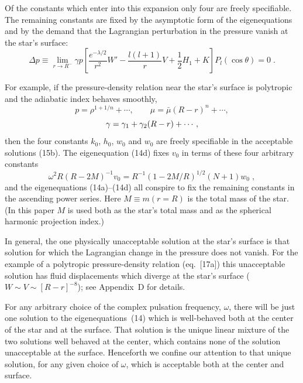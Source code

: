 \documentclass[12pt]{article}
\begin{document}
Of the constants which enter into this expansion only four are freely specifiable. The
remaining constants are fixed by the asymptotic form of the eigenequations and by the
demand that the Lagrangian perturbation in the pressure vanish at the star's surface:
\begin{equation}
  \Delta p \equiv \lim_{r \to R^-} \gamma p \left[
    \frac{e^{-\lambda/2}}{r^2} W' - \frac{l(l+1)}{r} V
    + \frac{1}{2} H_1 + K
  \right] P_l(\cos\theta) = 0\;.
\label{eq:16}
\end{equation}

For example, if the pressure-density relation near the star's surface is polytropic and the
adiabatic index behaves smoothly,
\begin{equation}
  p = \rho^{1+1/n} + \cdots, \qquad \mu = \bar{\mu}(R-r)^n + \cdots,
\label{eq:17a}
\end{equation}
\begin{equation}
  \gamma = \gamma_1 + \gamma_2(R-r) + \cdots,
\notag
\end{equation}
then the four constants $k_0$, $h_0$, $w_0$ and $w_0$ are freely specifiable in the acceptable solutions
(15b). The eigenequation (14d) fixes $v_0$ in terms of these four arbitrary constants
\begin{equation}
  \omega^2 R(R - 2M)^{-1} v_0 = R^{-1}(1 - 2M/R)^{1/2} (N+1) w_0\;,
\label{eq:17b}
\end{equation}
and the eigenequations (14a)--(14d) all conspire to fix the remaining constants in the
ascending power series. Here $M \equiv m(r = R)$ is the total mass of the star. (In this paper
$M$ is used both as the star's total mass and as the spherical harmonic projection index.)

In general, the one physically unacceptable solution at the star's surface is that
solution for which the Lagrangian change in the pressure does not vanish. For the
example of a polytropic pressure-density relation (eq.~[17a]) this unacceptable solution has
fluid displacements which diverge at the star's surface ($W \sim V \sim [R - r]^{-8}$); see
Appendix~D for details.

For any arbitrary choice of the complex pulsation frequency, $\omega$, there will be just one
solution to the eigenequations~(14) which is well-behaved both at the center of the star
and at the surface. That solution is the unique linear mixture of the two solutions
well behaved at the center, which contains none of the solution unacceptable at the
surface. Henceforth we confine our attention to that unique solution, for any given
choice of $\omega$, which is acceptable both at the center and surface.
\end{document}
